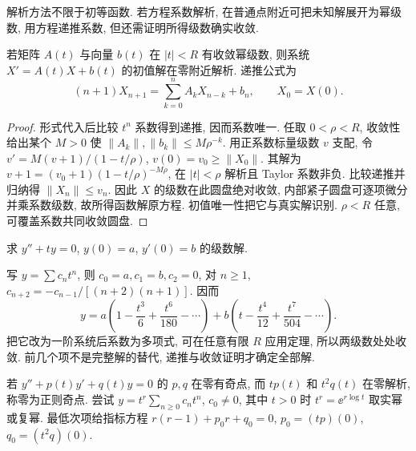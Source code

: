 解析方法不限于初等函数. 若方程系数解析, 在普通点附近可把未知解展开为幂级数, 用方程递推系数, 但还需证明所得级数确实收敛.
\begin{theorem}
若矩阵 $A(t)$ 与向量 $b(t)$ 在 $|t|<R$ 有收敛幂级数, 则系统 $X'=A(t)X+b(t)$ 的初值解在零附近解析. 递推公式为
\[
(n+1)X_{n+1}=\sum_{k=0}^n A_kX_{n-k}+b_n,\qquad X_0=X(0).
\]
\end{theorem}
\begin{proof}
形式代入后比较 $t^n$ 系数得到递推, 因而系数唯一. 任取 $0<\rho<R$, 收敛性给出某个 $M>0$ 使 $\|A_k\|,\|b_k\|\le M\rho^{-k}$. 用正系数标量级数 $v$ 支配, 令
$v'=M(v+1)/(1-t/\rho)$, $v(0)=v_0\ge\|X_0\|$. 其解为 $v+1=(v_0+1)(1-t/\rho)^{-M\rho}$, 在 $|t|<\rho$ 解析且 Taylor 系数非负. 比较递推并归纳得 $\|X_n\|\le v_n$. 因此 $X$ 的级数在此圆盘绝对收敛, 内部紧子圆盘可逐项微分并乘系数级数, 故所得函数解原方程. 初值唯一性把它与真实解识别. $\rho<R$ 任意, 可覆盖系数共同收敛圆盘.
\end{proof}
\begin{example}求 $y''+ty=0$, $y(0)=a$, $y'(0)=b$ 的级数解.\end{example}
\begin{solution}
写 $y=\sum c_nt^n$, 则 $c_0=a,c_1=b,c_2=0$, 对 $n\ge1$,
$c_{n+2}=-c_{n-1}/[(n+2)(n+1)]$. 因而
\[
y=a\left(1-\frac{t^3}{6}+\frac{t^6}{180}-\cdots\right)
+b\left(t-\frac{t^4}{12}+\frac{t^7}{504}-\cdots\right).
\]
把它改为一阶系统后系数为多项式, 可在任意有限 $R$ 应用定理, 所以两级数处处收敛. 前几个项不是完整解的替代, 递推与收敛证明才确定全部解.
\end{solution}
若 $y''+p(t)y'+q(t)y=0$ 的 $p,q$ 在零有奇点, 而 $tp(t)$ 和 $t^2q(t)$ 在零解析, 称零为正则奇点. 尝试 $y=t^r\sum_{n\ge0}c_nt^n$, $c_0\ne0$, 其中 $t>0$ 时 $t^r=\ee^{r\log t}$ 取实幂或复幂. 最低次项给指标方程 $r(r-1)+p_0r+q_0=0$, $p_0=(tp)(0)$, $q_0=(t^2q)(0)$.

